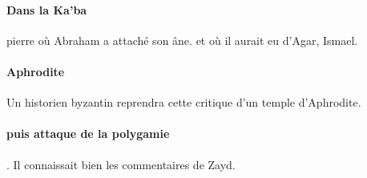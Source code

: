 \paragraph{Dans la Ka'ba} pierre où Abraham a attaché son âne. et où il aurait eu d'Agar, Ismael.

\paragraph{Aphrodite} Un historien byzantin reprendra cette critique d'un temple d'Aphrodite.

\paragraph{puis attaque de la polygamie}. 
Il connaissait bien les commentaires de Zayd. 

